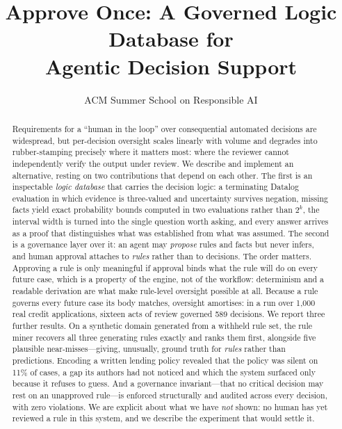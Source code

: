 \documentclass[sigconf,nonacm]{acmart}
\begin{document}
\title{Approve Once: A Governed Logic Database for\\Agentic Decision Support}

\author{ACM Summer School on Responsible AI}

\begin{abstract}
Requirements for a ``human in the loop'' over consequential automated decisions
are widespread, but per-decision oversight scales linearly with volume and
degrades into rubber-stamping precisely where it matters most: where the
reviewer cannot independently verify the output under review. We describe and
implement an alternative, resting on two contributions that depend on each
other. The first is an inspectable \emph{logic database} that carries the
decision logic: a terminating Datalog evaluation in which evidence is
three-valued and uncertainty survives negation, missing facts yield exact
probability bounds computed in two evaluations rather than $2^{k}$, the interval
width is turned into the single question worth asking, and every answer arrives
as a proof that distinguishes what was established from what was assumed. The
second is a governance layer over it: an agent may \emph{propose} rules and
facts but never infers, and human approval attaches to \emph{rules} rather than
to decisions. The order matters. Approving a rule is only meaningful if
approval binds what the rule will do on every future case, which is a property
of the engine, not of the workflow: determinism and a readable derivation are
what make rule-level oversight possible at all. Because a rule governs every future case
its body matches, oversight amortises: in a run over 1{,}000 real credit
applications, sixteen acts of review governed 589 decisions. We report three
further results. On a synthetic domain generated from a withheld rule set, the
rule miner recovers all three generating rules exactly and ranks them first,
alongside five plausible near-misses---giving, unusually, ground truth for
\emph{rules} rather than predictions. Encoding a written lending policy revealed
that the policy was silent on 11\% of cases, a gap its authors had not noticed
and which the system surfaced only because it refuses to guess. And a governance
invariant---that no critical decision may rest on an unapproved rule---is
enforced structurally and audited across every decision, with zero violations.
We are explicit about what we have \emph{not} shown: no human has yet reviewed a
rule in this system, and we describe the experiment that would settle it.
\end{abstract}
\end{document}

